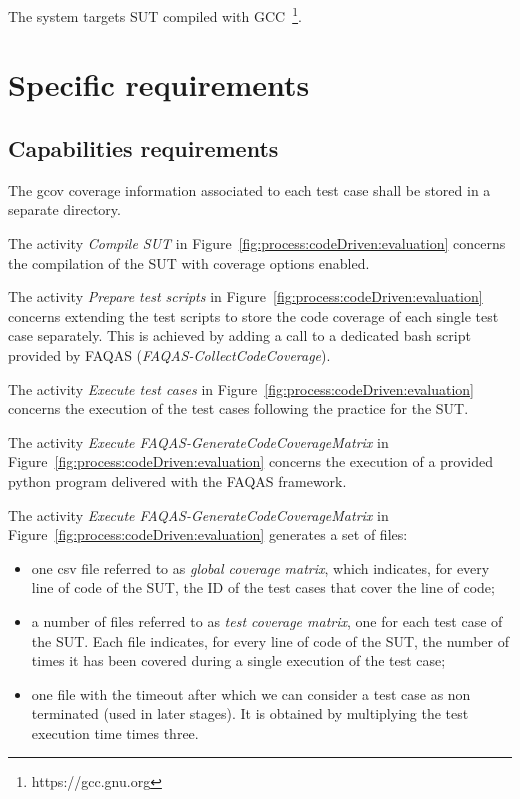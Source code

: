 \RQ{} The system targets SUT compiled with GCC~\footnote{https://gcc.gnu.org}.

\section{Specific requirements}
\subsection{Capabilities requirements}
\label{sec:rquirements:capabilities}

\RQ{} The gcov coverage information associated to each test case shall be stored in a separate directory.

\RQ{} The activity \emph{Compile SUT} in Figure~\ref{fig:process:codeDriven:evaluation} concerns the compilation of  the SUT with coverage options enabled.

\RQ{} The activity \emph{Prepare test scripts} in Figure~\ref{fig:process:codeDriven:evaluation} concerns extending the test scripts to store the code coverage of each single test case separately. This is achieved by adding a call to a dedicated bash script provided by FAQAS (\emph{FAQAS-CollectCodeCoverage}).

\RQ{} The activity \emph{Execute test cases} in Figure~\ref{fig:process:codeDriven:evaluation} concerns the execution of the test cases following the practice for the SUT.

\RQ{} The activity \emph{Execute FAQAS-GenerateCodeCoverageMatrix} in Figure~\ref{fig:process:codeDriven:evaluation} concerns the execution of a provided python program delivered with the FAQAS framework.

\RQ{} The activity \emph{Execute FAQAS-GenerateCodeCoverageMatrix} in Figure~\ref{fig:process:codeDriven:evaluation} generates a set of files: 
\begin{itemize}
\item one csv file referred to as \emph{global coverage matrix}, which indicates, for every line of code of the SUT, the ID of the test cases that cover the line of code;
\item a number of files  referred to as \emph{test coverage matrix}, one for each test case of the SUT. Each file indicates, for every line of code of the SUT, the number of times it has been covered during a single execution of the test case;
\item one file with the timeout after which we can consider a test case as non terminated (used in later stages). It is obtained by multiplying the test execution time times three.
\end{itemize}



